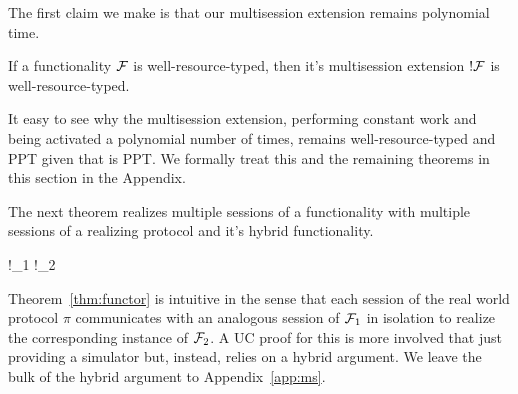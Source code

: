 %

The first claim we make is that our multisession extension remains polynomial time.
\begin{theorem}[PPT !]\label{thm:bangppt}
If a functionality $\mathcal{F}$ is well-resource-typed, then it's multisession extension $!\mathcal{F}$ is well-resource-typed.
\end{theorem}
It easy to see why the multisession extension, performing constant work and being activated a polynomial number of times, remains well-resource-typed and PPT given that \F is PPT.
We formally treat this and the remaining theorems in this section in the Appendix.

The next theorem realizes multiple sessions of a functionality with multiple sessions of a realizing protocol and it's hybrid functionality.
\begin{theorem}\label{thm:functor}
	\begin{mathpar}
		{
			!\F_1 \xrightarrow{!\pi} !\F_2
		}
	\end{mathpar}
\end{theorem}
Theorem~\ref{thm:functor} is intuitive in the sense that each session of the real world protocol $\pi$ communicates with an analogous session of $\mathcal{F}_1$ in isolation to realize the corresponding instance of $\mathcal{F}_2$. 
A UC proof for this is more involved that just providing a simulator but, instead, relies on a hybrid argument. 
We leave the bulk of the hybrid argument to Appendix~\ref{app:ms}.


